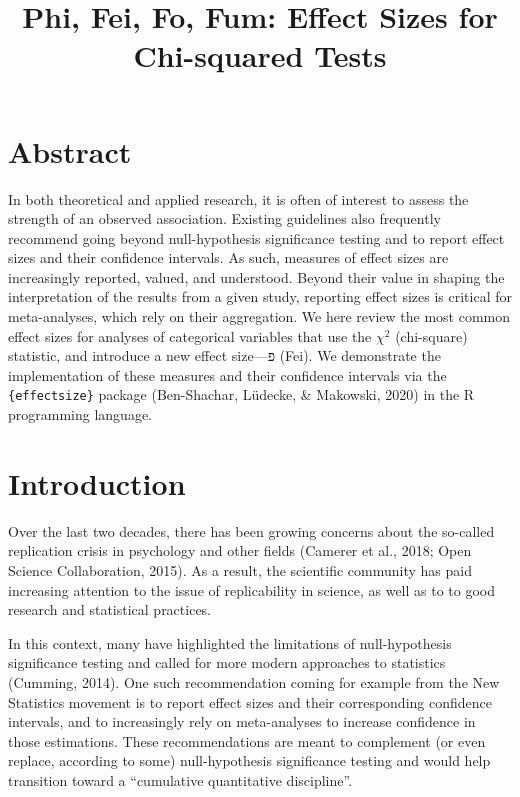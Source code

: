 \documentclass[
]{article}
\title{Phi, Fei, Fo, Fum: Effect Sizes for Chi-squared Tests}
\author{}
\date{\vspace{-2.5em}}
\begin{document}
\maketitle

\hypertarget{abstract}{%
\section{Abstract}\label{abstract}}

In both theoretical and applied research, it is often of interest to
assess the strength of an observed association. Existing guidelines also
frequently recommend going beyond null-hypothesis significance testing
and to report effect sizes and their confidence intervals. As such,
measures of effect sizes are increasingly reported, valued, and
understood. Beyond their value in shaping the interpretation of the
results from a given study, reporting effect sizes is critical for
meta-analyses, which rely on their aggregation. We here review the most
common effect sizes for analyses of categorical variables that use the
\(\chi^2\) (chi-square) statistic, and introduce a new effect size---פ
(Fei). We demonstrate the implementation of these measures and their
confidence intervals via the \texttt{\{effectsize\}} package
(Ben-Shachar, Lüdecke, \& Makowski, 2020) in the R programming language.

\hypertarget{introduction}{%
\section{Introduction}\label{introduction}}

Over the last two decades, there has been growing concerns about the
so-called replication crisis in psychology and other fields (Camerer et
al., 2018; Open Science Collaboration, 2015). As a result, the
scientific community has paid increasing attention to the issue of
replicability in science, as well as to to good research and statistical
practices.

In this context, many have highlighted the limitations of
null-hypothesis significance testing and called for more modern
approaches to statistics (Cumming, 2014). One such recommendation coming
for example from the New Statistics movement is to report effect sizes
and their corresponding confidence intervals, and to increasingly rely
on meta-analyses to increase confidence in those estimations. These
recommendations are meant to complement (or even replace, according to
some) null-hypothesis significance testing and would help transition
toward a ``cumulative quantitative discipline''.
\end{document}
